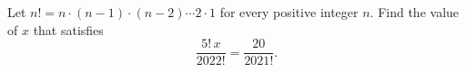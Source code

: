 Let $n!=n\cdot(n-1)\cdot(n-2)\cdots2\cdot1$ for every positive integer $n$. Find the value of $x$ that satisfies
\[\dfrac{5!\,x}{2022!}=\dfrac{20}{2021!}.\]
